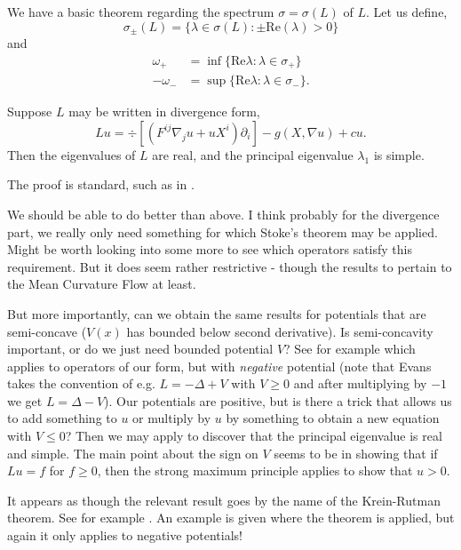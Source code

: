 \documentclass{amsart}
\begin{document}
We have a basic theorem regarding the spectrum \(\sigma = \sigma(L)\) of \(L\). Let us define,
\[
\sigma_{\pm} (L) = \{\lambda \in \sigma(L) : \pm \text{Re}(\lambda) > 0\}
\]
and
\begin{align*}
\omega_+ &= \inf \{\text{Re} \lambda : \lambda \in \sigma_+\} \\
- \omega_- &= \sup \{\text{Re} \lambda : \lambda \in \sigma_-\}.
\end{align*}

\begin{thm}
Suppose \(L\) may be written in divergence form,
\[
L u = \div\left[\left(F^{ij} \nabla_j u + u X^i\right)\partial_i\right] - g(X, \nabla u) + c u.
\]
Then the eigenvalues of \(L\) are real, and the principal eigenvalue \(\lambda_1\) is simple.
\end{thm}

The proof is standard, such as in \cite[Theorems 8.37, 8.38]{GilbargTrudinger:/2001}.

\begin{rem}
We should be able to do better than above. I think probably for the divergence part, we really only need something for which Stoke's theorem may be applied. Might be worth looking into some more to see which operators satisfy this requirement. But it does seem rather restrictive - though the results to pertain to the Mean Curvature Flow at least.
\end{rem}

\begin{rem}
But more importantly, can we obtain the same results for potentials that are semi-concave (\(V(x)\) has bounded below second derivative). Is semi-concavity important, or do we just need bounded potential \(V\)? See for example \cite[Theorem 6.5.3]{Evans:/1998} which applies to operators of our form, but with \emph{negative} potential (note that Evans takes the convention of e.g. \(L = -\Delta + V\) with \(V \geq 0\) and after multiplying by \(-1\) we get \(L = \Delta - V\)). Our potentials are positive, but is there a trick that allows us to add something to \(u\) or multiply by \(u\) by something to obtain a new equation with \(V \leq 0\)? Then we may apply \cite[Theorem 6.5.3]{Evans:/1998} to discover that the principal eigenvalue is real and simple. The main point about the sign on \(V\) seems to be in showing that if \(Lu = f\) for \(f \geq 0\), then the strong maximum principle applies to show that \(u > 0\).

It appears as though the relevant result goes by the name of the Krein-Rutman theorem. See for example \cite[Appendix C, Chapter 11]{smoller:/1983}. An example is given where the theorem is applied, but again it only applies to negative potentials!
\end{rem}
\end{document}
